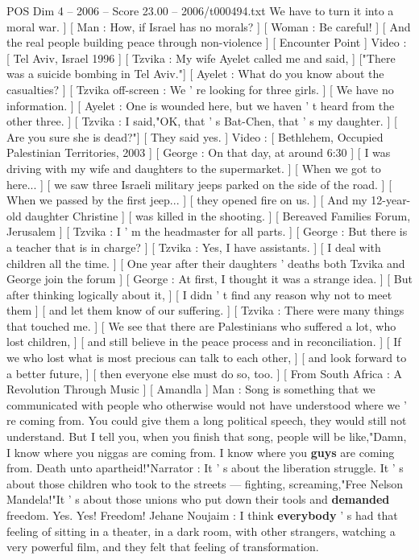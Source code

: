 \begin{textsample}{POS Dim 4 – 2006 – Score 23.00 – 2006/t000494.txt}
We have to turn it into a moral war. ] [ Man : How, if Israel has no morals? ] [ Woman : Be careful! ] [ And the real people building peace through non-violence ] [ Encounter Point ] Video : [ Tel Aviv, Israel 1996 ] [ Tzvika : My wife Ayelet called me and said, ] ["There was a suicide bombing in Tel Aviv."] [ Ayelet : What do you know about the casualties? ] [ Tzvika off-screen : We ' re looking for three girls. ] [ We have no information. ] [ Ayelet : One is wounded here, but we haven ' t heard from the other three. ] [ Tzvika : I said,"OK, that ' s Bat-Chen, that ' s my daughter. ] [ Are you sure she is dead?"] [ They said yes. ] Video : [ Bethlehem, Occupied Palestinian Territories, 2003 ] [ George : On that day, at around 6:30 ] [ I was driving with my wife and daughters to the supermarket. ] [ When we got to here... ] [ we saw three Israeli military jeeps parked on the side of the road. ] [ When we passed by the first jeep... ] [ they opened fire on us. ] [ And my 12-year-old daughter Christine ] [ was killed in the shooting. ] [ Bereaved Families Forum, Jerusalem ] [ Tzvika : I ' m the headmaster for all parts. ] [ George : But there is a teacher that is in charge? ] [ Tzvika : Yes, I have assistants. ] [ I deal with children all the time. ] [ One year after their daughters ' deaths both Tzvika and George join the forum ] [ George : At first, I thought it was a strange idea. ] [ But after thinking logically about it, ] [ I didn ' t find any reason why not to meet them ] [ and let them know of our suffering. ] [ Tzvika : There were many things that touched me. ] [ We see that there are Palestinians who suffered a lot, who lost children, ] [ and still believe in the peace process and in reconciliation. ] [ If we who lost what is most precious can talk to each other, ] [ and look forward to a better future, ] [ then everyone else must do so, too. ] [ From South Africa : A Revolution Through Music ] [ Amandla ] Man : Song is something that we communicated with people who otherwise would not have understood where we ' re coming from.
You could give them a long political speech, they would still not understand.
But I tell you, when you finish that song, people will be like,"Damn, I know where you niggas are coming from.
I know where you \textbf{guys} are coming from.
Death unto apartheid!"Narrator : It ' s about the liberation struggle.
It ' s about those children who took to the streets — fighting, screaming,"Free Nelson Mandela!"It ' s about those unions who put down their tools and \textbf{demanded} freedom.
Yes.
Yes!
Freedom!
Jehane Noujaim : I think \textbf{everybody} ' s had that feeling of sitting in a theater, in a dark room, with other strangers, watching a very powerful film, and they felt that feeling of transformation.

\end{textsample}
